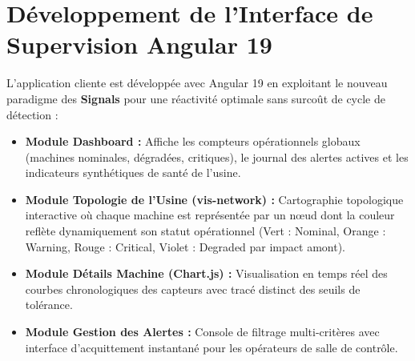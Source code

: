 \section{Développement de l'Interface de Supervision Angular 19}

L'application cliente est développée avec Angular 19 en exploitant le nouveau paradigme des \textbf{Signals} pour une réactivité optimale sans surcoût de cycle de détection :

\begin{itemize}
    \item \textbf{Module Dashboard :} Affiche les compteurs opérationnels globaux (machines nominales, dégradées, critiques), le journal des alertes actives et les indicateurs synthétiques de santé de l'usine.
    \item \textbf{Module Topologie de l'Usine (vis-network) :} Cartographie topologique interactive où chaque machine est représentée par un nœud dont la couleur reflète dynamiquement son statut opérationnel (Vert : Nominal, Orange : Warning, Rouge : Critical, Violet : Degraded par impact amont).
    \item \textbf{Module Détails Machine (Chart.js) :} Visualisation en temps réel des courbes chronologiques des capteurs avec tracé distinct des seuils de tolérance.
    \item \textbf{Module Gestion des Alertes :} Console de filtrage multi-critères avec interface d'acquittement instantané pour les opérateurs de salle de contrôle.
\end{itemize}
